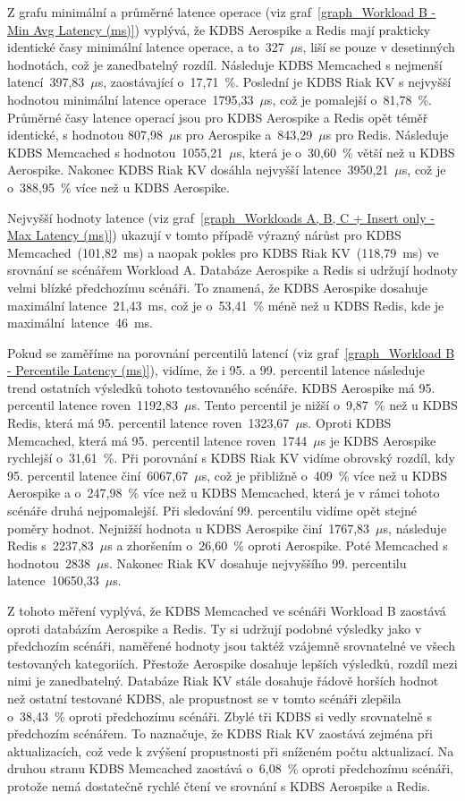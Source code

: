 \documentclass[czech,master,dept460,male,csharp,cpdeclaration]{diploma}
\begin{document}
	Z grafu minimální a průměrné latence operace (viz graf~\ref{graph_Workload B - Min Avg Latency (ms)}) vyplývá, že KDBS Aerospike a Redis mají prakticky identické časy minimální latence operace, a to~327~$\mu$s, liší se pouze v desetinných hodnotách, což je zanedbatelný rozdíl. Následuje KDBS Memcached s nejmenší latencí~397,83~$\mu$s, zaostávající o~17,71~\%. Poslední je KDBS Riak KV s nejvyšší hodnotou minimální latence operace~1795,33~$\mu$s, což je pomalejší o~81,78~\%. Průměrné časy latence operací jsou pro KDBS Aerospike a Redis opět téměř identické, s hodnotou 807,98~$\mu$s pro Aerospike a~843,29~$\mu$s pro Redis. Následuje KDBS Memcached s hodnotou~1055,21~$\mu$s, která je o~30,60~\% větší než u KDBS Aerospike. Nakonec KDBS Riak KV dosáhla nejvyšší latence~3950,21~$\mu$s, což je o~388,95~\% více než u KDBS Aerospike.
	
	Nejvyšší hodnoty latence (viz graf~\ref{graph_Workloads A, B, C + Insert only - Max Latency (ms)}) ukazují v tomto případě výrazný nárůst pro KDBS Memcached~(101,82~ms) a naopak pokles pro KDBS Riak KV~(118,79~ms) ve srovnání se scénářem Workload A. Databáze Aerospike a Redis si udržují hodnoty velmi blízké předchozímu scénáři. To znamená, že KDBS Aerospike dosahuje maximální latence~21,43~ms, což je o~53,41~\% méně než u KDBS Redis, kde je maximální~latence~46~ms.
	
	Pokud se zaměříme na porovnání percentilů latencí (viz graf~\ref{graph_Workload B - Percentile Latency (ms)}), vidíme, že i 95. a 99. percentil latence následuje trend ostatních výsledků tohoto testovaného scénáře. KDBS Aerospike má 95. percentil latence roven~1192,83~$\mu$s. Tento percentil je nižší o~9,87~\% než u KDBS Redis, která má 95. percentil latence roven~1323,67~$\mu$s. Oproti KDBS Memcached, která má 95. percentil latence roven~1744~$\mu$s je KDBS Aerospike rychlejší o~31,61~\%. Při porovnání s KDBS Riak KV vidíme obrovský rozdíl, kdy 95. percentil latence činí~6067,67~$\mu$s, což je přibližně o~409~\% více než u KDBS Aerospike a o~247,98~\% více než u KDBS Memcached, která je v rámci tohoto scénáře druhá nejpomalejší. Při sledování 99. percentilu vidíme opět stejné poměry hodnot. Nejnižší hodnota u KDBS Aerospike činí~1767,83~$\mu$s, následuje Redis s~2237,83~$\mu$s a zhoršením o~26,60~\% oproti Aerospike. Poté Memcached s hodnotou~2838~$\mu$s. Nakonec Riak KV dosahuje nejvyššího 99. percentilu latence~10650,33~$\mu$s.
	
	Z tohoto měření vyplývá, že KDBS Memcached ve scénáři Workload B zaostává oproti databázím Aerospike a Redis. Ty si udržují podobné výsledky jako v předchozím scénáři, naměřené hodnoty jsou taktéž vzájemně srovnatelné ve všech testovaných kategoriích. Přestože Aerospike dosahuje lepších výsledků, rozdíl mezi nimi je zanedbatelný. Databáze Riak KV stále dosahuje řádově horších hodnot než ostatní testované KDBS, ale propustnost se v tomto scénáři zlepšila o~38,43~\% oproti předchozímu scénáři. Zbylé tři KDBS si vedly srovnatelně s předchozím scénářem. To naznačuje, že KDBS Riak KV zaostává zejména při aktualizacích, což vede k zvýšení propustnosti při sníženém počtu aktualizací. Na druhou stranu KDBS Memcached zaostává o~6,08~\% oproti předchozímu scénáři, protože nemá dostatečně rychlé čtení ve srovnání s KDBS Aerospike a Redis.
	
\end{document}
